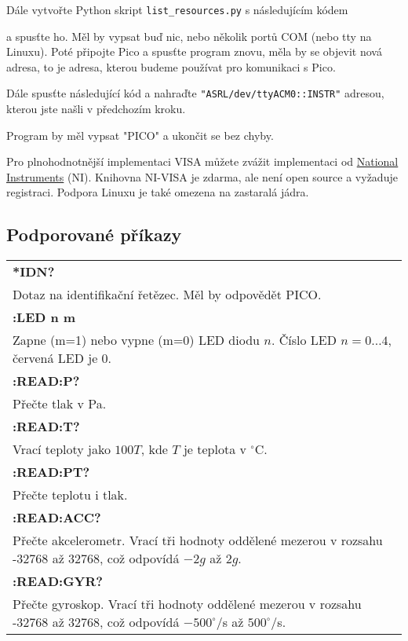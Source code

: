 Dále vytvořte Python skript \verb|list_resources.py| s následujícím kódem

a spusťte ho. Měl by vypsat buď nic, nebo několik portů COM (nebo tty na Linuxu). Poté připojte Pico a spusťte program znovu, měla by se objevit nová adresa, to je adresa, kterou budeme používat pro komunikaci s Pico.

Dále spusťte následující kód a nahraďte \verb|"ASRL/dev/ttyACM0::INSTR"| adresou, kterou jste našli v předchozím kroku.

Program by měl vypsat "PICO" a ukončit se bez chyby.

Pro plnohodnotnější implementaci VISA můžete zvážit implementaci od \href{https://www.ni.com/en/support/downloads/drivers/download.ni-visa.html#548367}{National Instruments} (NI). Knihovna NI-VISA je zdarma, ale není open source a vyžaduje registraci. Podpora Linuxu je také omezena na zastaralá jádra.

\subsection{Podporované příkazy}
\begin{tabular}{p{15cm}}
    \textbf{*IDN?}\\
    Dotaz na identifikační řetězec. Měl by odpovědět PICO.
    \\\hline
    \textbf{:LED n m}\\
    Zapne (m=1) nebo vypne (m=0) LED diodu $n$. Číslo LED $n = 0 \dots 4$, červená LED je 0.
    \\\hline
    \textbf{:READ:P?}\\
    Přečte tlak v Pa.
    \\\hline
    \textbf{:READ:T?}\\
    Vrací teploty jako $100T$, kde $T$ je teplota v $^\circ$C.
    \\\hline
    \textbf{:READ:PT?}\\
    Přečte teplotu i tlak.
    \\\hline
    \textbf{:READ:ACC?}\\
    Přečte akcelerometr. Vrací tři hodnoty oddělené mezerou v rozsahu -32768 až 32768, což odpovídá $-2g$ až $2g$.
    \\\hline
    \textbf{:READ:GYR?}\\
    Přečte gyroskop. Vrací tři hodnoty oddělené mezerou v rozsahu -32768 až 32768, což odpovídá $-500^\circ$/s až $500^\circ$/s.
\end{tabular}

